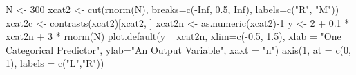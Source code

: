 \begin{Schunk}
\begin{Sinput}
 N <- 300
 xcat2 <- cut(rnorm(N), breaks=c(-Inf, 0.5, Inf), labels=c("R", "M"))
 xcat2c <- contrasts(xcat2)[xcat2, ]	
 xcat2n <- as.numeric(xcat2)-1
 y <- 2 + 0.1 * xcat2n + 3 * rnorm(N)
 plot.default(y ~ xcat2n, xlim=c(-0.5, 1.5), xlab = "One Categorical Predictor", ylab="An Output Variable", xaxt = "n")
 axis(1, at = c(0, 1), labels = c("L","R"))
\end{Sinput}
\end{Schunk}
